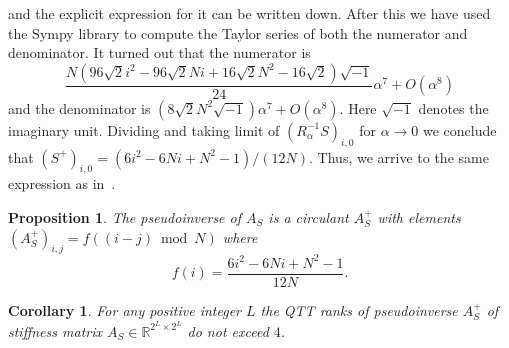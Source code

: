 \documentclass[a4paper]{article}
\newtheorem{corollary}{Corollary}[section]
\newtheorem{proposition}{Proposition}[section]
\newcommand{\LL}{L}
\newcommand{\stiff}{L}
\newcommand{\lap}{A_S}
\newcommand{\base}{2}
\newcommand{\stiffnessQ}{R}
\begin{document}
    and the explicit expression for it can be written down.
    After this we have used the Sympy library to compute the Taylor series of both the numerator and denominator.
    It turned out that the numerator is 
    \[
    \frac{N \left(96 \sqrt{2} i^{2} - 96 \sqrt{2} N i + 16 \sqrt{2} N^{2}  - 16 \sqrt{2}\right)\sqrt{-1}}{24}\alpha^7 + O(\alpha^8)
    \]
    and the denominator is $(8\sqrt{2}N^2\sqrt{-1})\alpha^7 + O(\alpha^8)$.
    Here $\sqrt{-1}$ denotes the imaginary unit.
    Dividing and taking limit of $(\stiffnessQ_\alpha^{-1}S)_{i,0}$ for $\alpha \to 0$ we conclude that
    $(S^+)_{i,0} = (6i^2 - 6Ni + N^2-1)/(12N)$. 
    Thus, we arrive to the same expression as in~\cite{plonka2016pseudo}.
	\begin{proposition}
		The pseudoinverse of $\lap$ is a circulant $\lap^+$ with elements $(\lap^+)_{i,j} = f((i-j)\bmod N)$ where 
		\[
			f(i) = \frac{6i^2 - 6Ni + N^2-1}{12N}.
		\]
	\end{proposition}
		
	\begin{corollary}
	For any positive integer $\LL$ the QTT ranks of pseudoinverse $\lap^+$ of stiffness matrix $\lap \in \mathbb{R}^{\base^\LL \times \base^\LL}$ do not exceed $4$.
	\end{corollary}

\end{document}
